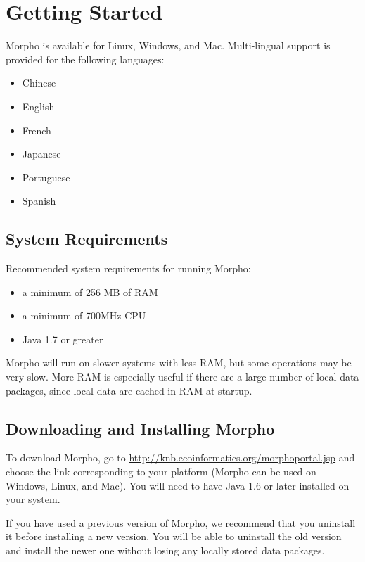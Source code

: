 \section{Getting Started}

Morpho is available for Linux, Windows, and Mac.
Multi-lingual support is provided for the following languages:
\begin{itemize}
 \item Chinese
 \item English
 \item French
 \item Japanese
 \item Portuguese
 \item Spanish
\end{itemize}

\subsection{System Requirements}

Recommended system requirements for running Morpho: 
\begin{itemize}
 \item a minimum of 256 MB of RAM 
 \item a minimum of 700MHz CPU 
 \item Java 1.7 or greater 
\end{itemize}

Morpho will run on slower systems with less RAM, but some operations may
be very slow. More RAM is especially useful if there are a large number
of local data packages, since local data are cached in RAM at startup. 

\subsection{Downloading and Installing Morpho}

To download Morpho, go to
\url{http://knb.ecoinformatics.org/morphoportal.jsp}
and choose the link corresponding to your platform (Morpho can be used
on Windows, Linux, and Mac). You will need to have Java 1.6 or later
installed on your system.

If you have used a previous version of Morpho, we recommend that you
uninstall it before installing a new version. You will be able to
uninstall the old version and install the newer one without losing any
locally stored data packages. 

